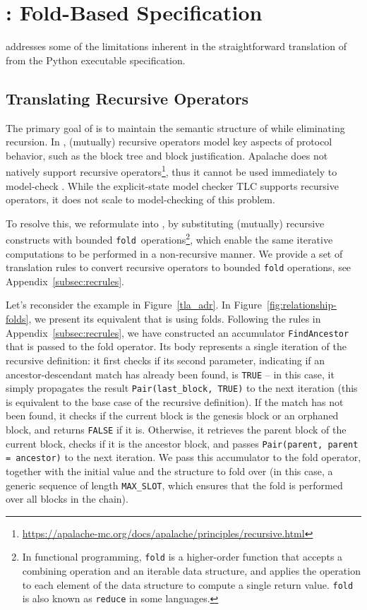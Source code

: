 
\section{\SpecTwo{}: Fold-Based Specification}\label{sec:spec2}

\SpecTwo{} addresses some of the limitations inherent in the straightforward
translation of \SpecOne{} from the Python executable specification.

\subsection{Translating Recursive \tlap{} Operators}

The primary goal of \SpecTwo{} is to maintain the semantic structure of
\SpecOne{} while eliminating recursion. In \SpecOne{}, (mutually) recursive
operators model key aspects of protocol behavior, such as the block tree and
block justification. Apalache does not natively support recursive
operators\footnote{\url{https://apalache-mc.org/docs/apalache/principles/recursive.html}},
thus it cannot be used immediately to model-check \SpecOne{}. While the
explicit-state \tlap{} model checker TLC supports recursive operators, it does
not scale to model-checking of this problem.

To resolve this, we reformulate \SpecOne{} into \SpecTwo{}, by substituting
(mutually) recursive constructs with bounded
\texttt{fold}~operations\footnote{In functional programming, \texttt{fold} is a
higher-order function that accepts a combining operation and an iterable data
structure, and applies the operation to each element of the data structure
to compute a single return value. \texttt{fold} is also known as
\texttt{reduce} in some languages.}, which enable the same iterative
computations to be performed in a non-recursive manner. We provide a set of
translation rules to convert recursive operators to bounded \texttt{fold}
operations, see Appendix~\ref{subsec:recrules}.

Let's reconsider the example in Figure~\ref{tla_adr}. In
Figure~\ref{fig:relationship-folds}, we present its equivalent that is using
folds. Following the rules in Appendix~\ref{subsec:recrules}, we have
constructed an accumulator \texttt{FindAncestor} that is passed to the fold
operator. Its body represents a single iteration of the recursive definition: it
first checks if its second parameter, indicating if an ancestor-descendant match
has already been found, is \texttt{TRUE} -- in this case, it simply propagates
the result \texttt{Pair(last\_block, TRUE)} to the next iteration (this is
equivalent to the base case of the recursive definition). If the match has not
been found, it checks if the current block is the genesis block or an orphaned
block, and returns \texttt{FALSE} if it is. Otherwise, it retrieves the parent
block of the current block, checks if it is the ancestor block, and passes
\texttt{Pair(parent, parent = ancestor)} to the next iteration. We pass this
accumulator to the fold operator, together with the initial value and the
structure to fold over (in this case, a generic sequence of length
\texttt{MAX\_SLOT}, which ensures that the fold is performed over all blocks in
the chain).


